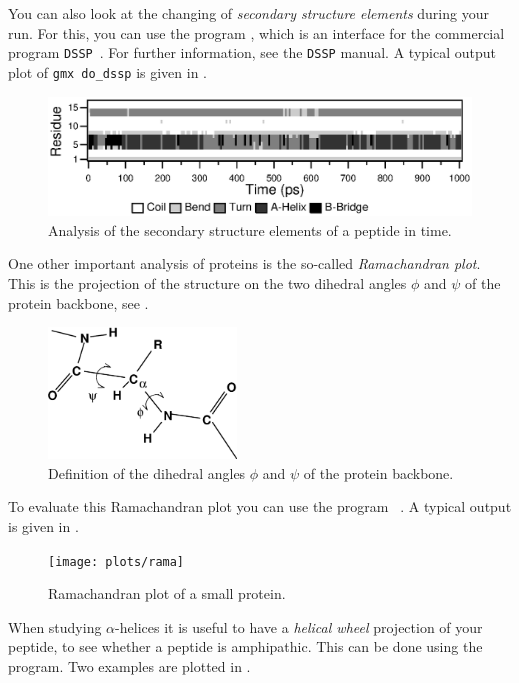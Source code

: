 You can also look at the changing of {\em secondary structure elements} 
during your run. For this, you can use the program {\tt {}}, which is 
an interface for the commercial program {\tt DSSP}~\cite{Kabsch83}. For 
further information, see the {\tt DSSP} manual. A typical output plot of 
{\tt gmx do_dssp} is given in .

\begin{figure}
\centerline{
\includegraphics[width=12cm]{plots/dssp}}
\caption{Analysis of the secondary structure elements of a peptide in time.}
\label{fig:dssp}
\end{figure}

One other important analysis of proteins is the so-called 
{\em Ramachandran plot}. 
This is the projection of the structure on the two dihedral angles $\phi$ and 
$\psi$ of the protein backbone, see .

\begin{figure}
\centerline{
\includegraphics[width=5cm]{plots/phipsi}}
\caption{Definition of the dihedral angles $\phi$ and $\psi$ of the protein backbone.}
\label{fig:phipsi}
\end{figure}

To evaluate this Ramachandran plot you can use the program {\tt
{}}.
A typical output is given in .

\begin{figure}
\centerline{
{\texttt{[image: plots/rama]}}}
\caption{Ramachandran plot of a small protein.}
\label{fig:rama}
\end{figure}

When studying $\alpha$-helices 
it is useful to have a {\em helical wheel} projection
of your peptide, to see whether a peptide is amphipathic. This can be done
using the {\tt {}} program. Two examples are
plotted in .


